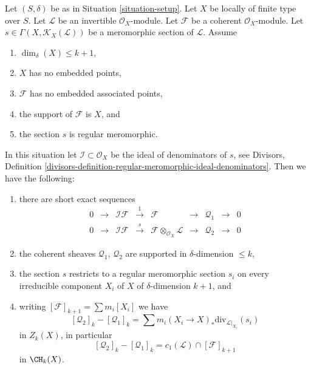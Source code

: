 \begin{lemma}
\label{lemma-no-embedded-points}
Let $(S, \delta)$ be as in Situation \ref{situation-setup}.
Let $X$ be locally of finite type over $S$.
Let $\mathcal{L}$ be an invertible $\mathcal{O}_X$-module.
Let $\mathcal{F}$ be a coherent $\mathcal{O}_X$-module.
Let $s \in \Gamma(X, \mathcal{K}_X(\mathcal{L}))$ be a
meromorphic section of $\mathcal{L}$.
Assume
\begin{enumerate}
\item $\dim_\delta(X) \leq k + 1$,
\item $X$ has no embedded points,
\item $\mathcal{F}$ has no embedded associated points,
\item the support of $\mathcal{F}$ is $X$, and
\item the section $s$ is regular meromorphic.
\end{enumerate}
In this situation let $\mathcal{I} \subset \mathcal{O}_X$
be the ideal of denominators of $s$, see
Divisors,
Definition \ref{divisors-definition-regular-meromorphic-ideal-denominators}.
Then we have the following:
\begin{enumerate}
\item there are short exact sequences
$$
\begin{matrix}
0 &
\to &
\mathcal{I}\mathcal{F} &
\xrightarrow{1} &
\mathcal{F} &
\to &
\mathcal{Q}_1 &
\to &
0 \\
0 &
\to &
\mathcal{I}\mathcal{F} &
\xrightarrow{s} &
\mathcal{F} \otimes_{\mathcal{O}_X} \mathcal{L} &
\to &
\mathcal{Q}_2 &
\to &
0
\end{matrix}
$$
\item the coherent sheaves $\mathcal{Q}_1$, $\mathcal{Q}_2$
are supported in $\delta$-dimension $\leq k$,
\item the section $s$ restricts to a regular meromorphic
section $s_i$ on every irreducible component $X_i$ of
$X$ of $\delta$-dimension $k + 1$, and
\item writing $[\mathcal{F}]_{k + 1} = \sum m_i[X_i]$ we have
$$
[\mathcal{Q}_2]_k - [\mathcal{Q}_1]_k
=
\sum m_i(X_i \to X)_*\text{div}_{\mathcal{L}|_{X_i}}(s_i)
$$
in $Z_k(X)$, in particular
$$
[\mathcal{Q}_2]_k - [\mathcal{Q}_1]_k
=
c_1(\mathcal{L}) \cap [\mathcal{F}]_{k + 1}
$$
in $\CH_k(X)$.
\end{enumerate}
\end{lemma}

